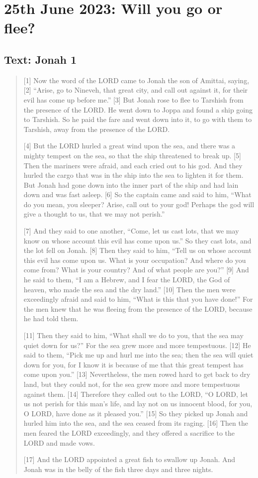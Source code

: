 \setcounter{figure}{0}

\section{25th June 2023: Will you go or flee?}
\subsection*{Text: Jonah 1}
  \begin{quote}
    [1] Now the word of the LORD came to Jonah the son of Amittai, saying, [2] “Arise, go to Nineveh, that great city, and call out against it, for their evil has come up before me.” [3] But Jonah rose to flee to Tarshish from the presence of the LORD. He went down to Joppa and found a ship going to Tarshish. So he paid the fare and went down into it, to go with them to Tarshish, away from the presence of the LORD.

    [4] But the LORD hurled a great wind upon the sea, and there was a mighty tempest on the sea, so that the ship threatened to break up. [5] Then the mariners were afraid, and each cried out to his god. And they hurled the cargo that was in the ship into the sea to lighten it for them. But Jonah had gone down into the inner part of the ship and had lain down and was fast asleep. [6] So the captain came and said to him, “What do you mean, you sleeper? Arise, call out to your god! Perhaps the god will give a thought to us, that we may not perish.”

    [7] And they said to one another, “Come, let us cast lots, that we may know on whose account this evil has come upon us.” So they cast lots, and the lot fell on Jonah. [8] Then they said to him, “Tell us on whose account this evil has come upon us. What is your occupation? And where do you come from? What is your country? And of what people are you?” [9] And he said to them, “I am a Hebrew, and I fear the LORD, the God of heaven, who made the sea and the dry land.” [10] Then the men were exceedingly afraid and said to him, “What is this that you have done!” For the men knew that he was fleeing from the presence of the LORD, because he had told them.

    [11] Then they said to him, “What shall we do to you, that the sea may quiet down for us?” For the sea grew more and more tempestuous. [12] He said to them, “Pick me up and hurl me into the sea; then the sea will quiet down for you, for I know it is because of me that this great tempest has come upon you.” [13] Nevertheless, the men rowed hard to get back to dry land, but they could not, for the sea grew more and more tempestuous against them. [14] Therefore they called out to the LORD, “O LORD, let us not perish for this man’s life, and lay not on us innocent blood, for you, O LORD, have done as it pleased you.” [15] So they picked up Jonah and hurled him into the sea, and the sea ceased from its raging. [16] Then the men feared the LORD exceedingly, and they offered a sacrifice to the LORD and made vows.

    [17] And the LORD appointed a great fish to swallow up Jonah. And Jonah was in the belly of the fish three days and three nights.
  \end{quote}
